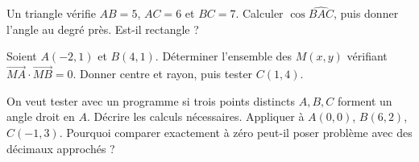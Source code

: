\documentclass[11pt,a4paper]{article}
\begin{document}
\par\noindent\begin{minipage}{\linewidth}
Un triangle vérifie $AB=5$, $AC=6$ et $BC=7$. Calculer $\cos\widehat{BAC}$, puis donner l’angle au degré près. Est-il rectangle ?
\end{minipage}\par
\par\noindent\begin{minipage}{\linewidth}
Soient $A(-2,1)$ et $B(4,1)$. Déterminer l’ensemble des $M(x,y)$ vérifiant $\overrightarrow{MA}\cdot\overrightarrow{MB}=0$. Donner centre et rayon, puis tester $C(1,4)$.
\end{minipage}\par
\par\noindent\begin{minipage}{\linewidth}
On veut tester avec un programme si trois points distincts $A,B,C$ forment un angle droit en $A$. Décrire les calculs nécessaires. Appliquer à $A(0,0)$, $B(6,2)$, $C(-1,3)$. Pourquoi comparer exactement à zéro peut-il poser problème avec des décimaux approchés ?
\end{minipage}\par
\end{document}
